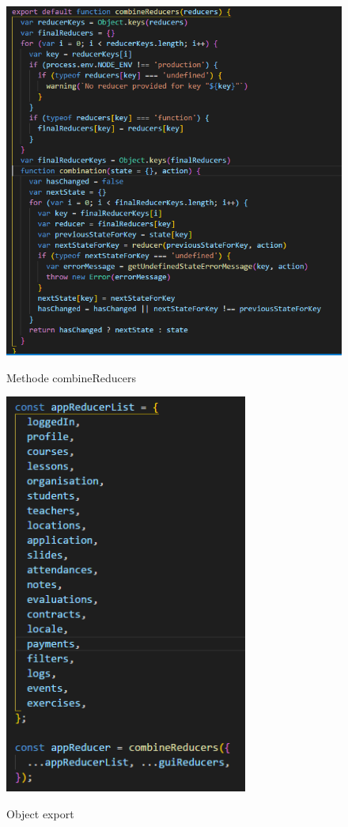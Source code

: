 \documentclass[fleqn,a4paper,12pt]{book}
\begin{document}
\begin{figure}
	\begin{center}
		\caption{Methode combineReducers}
		\includegraphics[width=14cm]{img/combineReducers}\\[0.5cm]
	\end{center}
\end{figure}
\begin{figure}
	\begin{center}
		\caption{Object export}
		\includegraphics[width=8cm]{img/combineReducers-object-export}\\[0.5cm]
	\end{center}
\end{figure}
\end{document}
